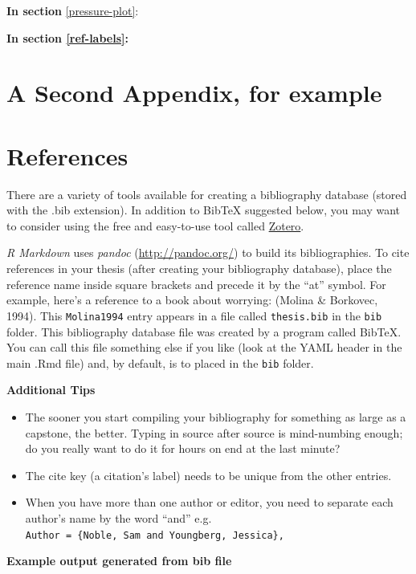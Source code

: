 \documentclass[12pt,oneside]{chicagocapstone}
\providecommand{\tightlist}{%
  \setlength{\itemsep}{0pt}\setlength{\parskip}{0pt}}
\begin{document}
\textbf{In section} \ref{pressure-plot}:

\textbf{In section \ref{ref-labels}:}

\hypertarget{a-second-appendix-for-example}{%
\chapter{A Second Appendix, for example}\label{a-second-appendix-for-example}}

\backmatter

\hypertarget{references}{%
\chapter*{References}\label{references}}


\noindent

\setlength{\parindent}{-0.20in}
\setlength{\leftskip}{0.20in}
\setlength{\parskip}{8pt}

There are a variety of tools available for creating a bibliography database (stored with the .bib extension). In addition to BibTeX suggested below, you may want to consider using the free and easy-to-use tool called \href{https://www.zotero.org/}{Zotero}.

\emph{R Markdown} uses \emph{pandoc} (\url{http://pandoc.org/}) to build its bibliographies. To cite references in your thesis (after creating your bibliography database), place the reference name inside square brackets and precede it by the ``at'' symbol. For example, here's a reference to a book about worrying: (Molina \& Borkovec, 1994). This \texttt{Molina1994} entry appears in a file called \texttt{thesis.bib} in the \texttt{bib} folder. This bibliography database file was created by a program called BibTeX. You can call this file something else if you like (look at the YAML header in the main .Rmd file) and, by default, is to placed in the \texttt{bib} folder.

\textbf{Additional Tips}
\begin{itemize}
\tightlist
\item
  The sooner you start compiling your bibliography for something as large as a capstone, the better. Typing in source after source is mind-numbing enough; do you really want to do it for hours on end at the last minute?
\item
  The cite key (a citation's label) needs to be unique from the other entries.
\item
  When you have more than one author or editor, you need to separate each author's name by the word ``and'' e.g. \texttt{Author\ =\ \{Noble,\ Sam\ and\ Youngberg,\ Jessica\},}
\end{itemize}
\textbf{Example output generated from bib file}
\end{document}

